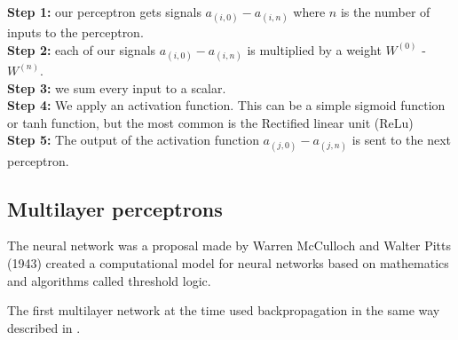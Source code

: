 \textbf{Step 1:} our perceptron gets signals $a_{(i,0)}-a_{(i,n)}$ where $n$ is the number of inputs to the perceptron.\\

\textbf{Step 2:} each of our signals $a_{(i,0)}-a_{(i,n)}$ is multiplied by a weight $W^{(0)}$ -  $W^{(n)}$. \\

\textbf{Step 3:} we sum every input to a scalar. \\

\textbf{Step 4:} We apply an activation function. This can be a simple sigmoid function or tanh function, but the most common is the Rectified linear unit (ReLu)  \\ 

\textbf{Step 5:} The output of the activation function $a_{(j,0)}-a_{(j,n)}$ is sent to the next perceptron. 




\subsection{Multilayer perceptrons}
The neural network was a proposal made by Warren McCulloch and Walter Pitts (1943)   created a computational model for neural networks based on mathematics and algorithms called threshold logic. 

The first multilayer network at the time used backpropagation in the same way described in .

